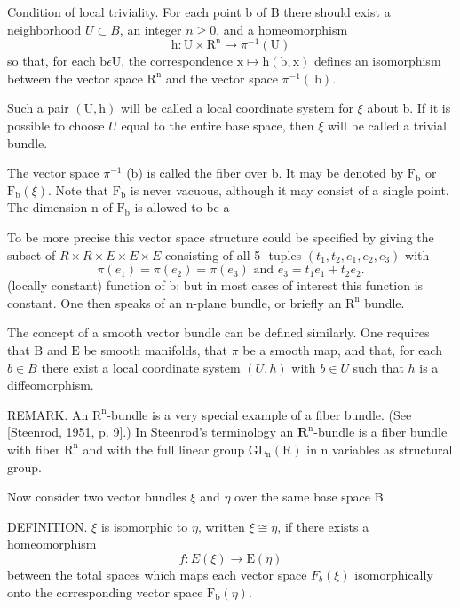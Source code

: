 \documentclass[10pt]{article}
\begin{document}
Condition of local triviality. For each point $\mathrm{b}$ of $\mathrm{B}$ there should exist a neighborhood $U \subset B$, an integer $n \geq 0$, and a homeomorphism
$$
\mathrm{h}: \mathrm{U} \times \mathrm{R}^{\mathrm{n}} \rightarrow \pi^{-1}(\mathrm{U})
$$
so that, for each $\mathrm{b} \epsilon \mathrm{U}$, the correspondence $\mathrm{x} \mapsto \mathrm{h}(\mathrm{b}, \mathrm{x})$ defines an isomorphism between the vector space $\mathrm{R}^{\mathrm{n}}$ and the vector space $\pi^{-1}(\mathrm{~b})$.

Such a pair $(\mathrm{U}, \mathrm{h})$ will be called a local coordinate system for $\xi$ about b. If it is possible to choose $U$ equal to the entire base space, then $\xi$ will be called a trivial bundle.

The vector space $\pi^{-1}$ (b) is called the fiber over b. It may be denoted by $\mathrm{F}_{\mathrm{b}}$ or $\mathrm{F}_{\mathrm{b}}(\xi)$. Note that $\mathrm{F}_{\mathrm{b}}$ is never vacuous, although it may consist of a single point. The dimension $\mathrm{n}$ of $\mathrm{F}_{\mathrm{b}}$ is allowed to be a

To be more precise this vector space structure could be specified by giving the subset of $R \times R \times E \times E \times E$ consisting of all 5 -tuples $\left(t_{1}, t_{2}, e_{1}, e_{2}, e_{3}\right)$ with
$$
\pi\left(e_{1}\right)=\pi\left(e_{2}\right)=\pi\left(e_{3}\right) \text { and } e_{3}=t_{1} e_{1}+t_{2} e_{2} .
$$
(locally constant) function of $\mathrm{b}$; but in most cases of interest this function is constant. One then speaks of an $\mathrm{n}$-plane bundle, or briefly an $\mathrm{R}^{\mathrm{n}}$ bundle.

The concept of a smooth vector bundle can be defined similarly. One requires that $\mathrm{B}$ and $\mathrm{E}$ be smooth manifolds, that $\pi$ be a smooth map, and that, for each $b \in B$ there exist a local coordinate system $(U, h)$ with $b \in U$ such that $h$ is a diffeomorphism.

REMARK. An $\mathrm{R}^{\mathrm{n}}$-bundle is a very special example of a fiber bundle. (See [Steenrod, 1951, p. 9].) In Steenrod's terminology an $\mathbf{R}^{\mathrm{n}}$-bundle is a fiber bundle with fiber $\mathrm{R}^{\mathrm{n}}$ and with the full linear group $\mathrm{GL}_{\mathrm{n}}(\mathrm{R})$ in $\mathrm{n}$ variables as structural group.

Now consider two vector bundles $\xi$ and $\eta$ over the same base space B.

DEFINITION. $\xi$ is isomorphic to $\eta$, written $\xi \cong \eta$, if there exists a homeomorphism
$$
f: E(\xi) \rightarrow \mathrm{E}(\eta)
$$
between the total spaces which maps each vector space $F_{b}(\xi)$ isomorphically onto the corresponding vector space $\mathrm{F}_{\mathrm{b}}(\eta)$.
\end{document}
